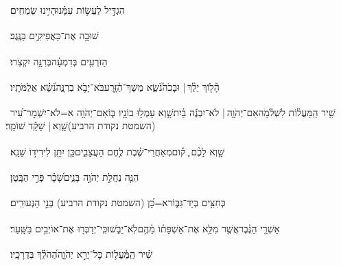 \documentclass[12pt]{article}
\newcommand{\loc}[1]{\textsuperscript{\locf{#1}}}
\begin{document}
{\loc{ ג}~}‏הִגְדִּ֣יל  לַעֲשׂ֥וֹת עִמָּ֗נוּ{\hfill}הָיִ֥ינוּ שְׂמֵחִֽים׃\par

{\loc{ ד}~}‏שׁוּבָ֣ה  אֶת־{\hfill}כַּאֲפִיקִ֥ים בַּנֶּֽגֶב׃\par

{\loc{ ה}~}‏הַזֹּרְעִ֥ים בְּדִמְעָ֗ה{\hfill}בְּרִנָּ֥ה יִקְצֹֽרוּ׃\par

{\loc{ ו}~}‏הָ֘ל֤וֹךְ יֵלֵ֨ךְ |  וּבָכֹה֮{\hfill}נֹשֵׂ֢א מֶשֶׁךְ־הַ֫זָּ֥רַע\newline\hspace*{.5em}בֹּא־יָבֹ֥א בְרִנָּ֑ה{\hfill}נֹ֝שֵׂ֗א אֲלֻמֹּתָֽיו׃\par\pend

\pstart[\subsection*{\textcolor{red}{פרק קכז}}]\label{פרק קכז}
{\loc{ א}~}‏שִׁ֥יר הַֽמַּעֲל֗וֹת לִשְׁלֹ֫מֹ֥ה\newline\hspace*{.5em}אִם־יְהֹוָ֤ה |  לֹא־יִבְנֶ֬ה בַ֗יִת{\hfill}שָׁ֤וְא עָמְל֣וּ בוֹנָ֣יו בּ֑וֹ\newline\hspace*{.5em}אִם־יְהֹוָ֥ה א=לֹא־יִשְׁמׇר־עִ֝יר (השמטת נקודת הרביע){\hfill}שָׁ֤וְא |  שָׁקַ֬ד שׁוֹמֵֽר׃\par

{\loc{ ב}~}‏שָׁ֤וְא לָכֶ֨ם ֪ ק֡וּם{\hfill}מְאַחֲרֵי־שֶׁ֗בֶת\newline\hspace*{.5em} לֶ֣חֶם הָעֲצָבִ֑ים{\hfill}כֵּ֤ן יִתֵּ֖ן לִידִיד֣וֹ שֵׁנָֽא׃\par

{\loc{ ג}~}‏הִנֵּ֤ה נַחֲלַ֣ת יְהֹוָ֣ה בָּנִ֑ים{\hfill}שָׂ֝כָ֗ר פְּרִ֣י הַבָּֽטֶן׃\par

{\loc{ ד}~}‏כְּחִצִּ֥ים בְּיַד־גִּבּ֑וֹר{\hfill}א=כֵּ֝ן (השמטת נקודת הרביע) בְּנֵ֣י הַנְּעוּרִֽים׃\par

{\loc{ ה}~}‏אַשְׁרֵ֤י הַגֶּ֗בֶר{\hfill}אֲשֶׁ֤ר מִלֵּ֥א אֶת־אַשְׁפָּת֗וֹ מֵ֫הֶ֥ם\newline\hspace*{.5em}לֹֽא־יֵבֹ֑שׁוּ{\hfill}כִּֽי־יְדַבְּר֖וּ אֶת־אוֹיְבִ֣ים בַּשָּֽׁעַר׃\par\pend
\ledpb
\pstart[\subsection*{\textcolor{red}{פרק קכח}}]\label{פרק קכח}
{\loc{ א}~}‏שִׁ֗יר הַֽמַּ֫עֲל֥וֹת\newline\hspace*{.5em} כׇּל־יְרֵ֣א יְהֹוָ֑ה{\hfill}הַ֝הֹלֵ֗ךְ בִּדְרָכָֽיו׃\par
\end{document}
